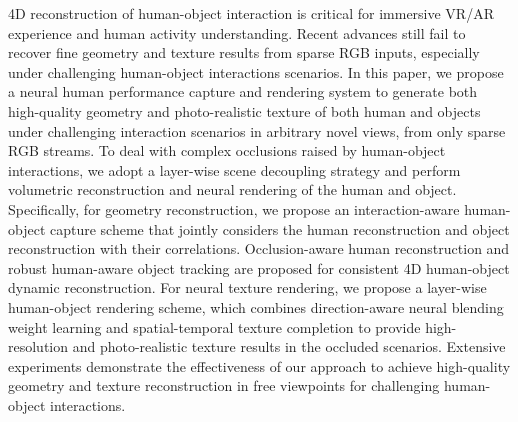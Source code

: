 4D reconstruction of human-object interaction is critical for immersive VR/AR experience and human activity understanding.
%
Recent advances still fail to recover fine geometry and texture results from sparse RGB inputs, especially under challenging human-object interactions scenarios. 
%
In this paper, we propose a neural human performance capture and rendering system to generate both high-quality geometry and photo-realistic texture of both human and objects under challenging interaction scenarios in arbitrary novel views, from only sparse RGB streams. 
%
To deal with complex occlusions raised by human-object interactions, we adopt a layer-wise scene decoupling strategy and perform volumetric reconstruction and neural rendering of the human and object.
%
Specifically, for geometry reconstruction, we propose an interaction-aware human-object capture scheme that jointly considers the human reconstruction and object reconstruction with their correlations. Occlusion-aware human reconstruction and robust human-aware object tracking are proposed for consistent 4D human-object dynamic reconstruction. 
%
For neural texture rendering, we propose a layer-wise human-object rendering scheme, which combines direction-aware neural blending weight learning and spatial-temporal texture completion to provide high-resolution and photo-realistic texture results in the occluded scenarios.
%
Extensive experiments demonstrate the effectiveness of our approach to achieve high-quality geometry and texture reconstruction in free viewpoints for challenging human-object interactions.
